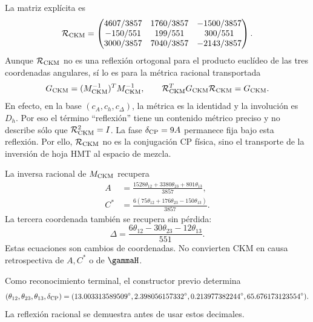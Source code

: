 La matriz expl\'icita es
\begin{equation}
\label{eq:modular-Rckm-matrix}
\mathcal R_{\rm CKM}=
\begin{pmatrix}
4607/3857&1760/3857&-1500/3857\\
-150/551&199/551&300/551\\
3000/3857&7040/3857&-2143/3857
\end{pmatrix}.
\end{equation}
Aunque \(\mathcal R_{\rm CKM}\) no es una reflexi\'on ortogonal para el
producto eucl\'ideo de las tres coordenadas angulares, s\'i lo es para la
m\'etrica racional transportada
\begin{equation}
\label{eq:modular-ckm-metric}
G_{\rm CKM}=(M_{\rm CKM}^{-1})^TM_{\rm CKM}^{-1},
\qquad
\mathcal R_{\rm CKM}^TG_{\rm CKM}\mathcal R_{\rm CKM}=G_{\rm CKM}.
\end{equation}
En efecto, en la base \((c_A,c_h,c_\Delta)\), la m\'etrica es la identidad
y la involuci\'on es \(D_h\). Por eso el t\'ermino ``reflexi\'on'' tiene un
contenido m\'etrico preciso y no describe s\'olo que
\(\mathcal R_{\rm CKM}^2=I\).
La fase \(\delta_{\rm CP}=9A\) permanece fija bajo esta reflexi\'on. Por
ello, \(\mathcal R_{\rm CKM}\) no es la conjugaci\'on CP f\'isica, sino el
transporte de la inversi\'on de hoja HMT al espacio de mezcla.

La inversa racional de \(M_{\rm CKM}\) recupera
\begin{align}
A&=\frac{1528\theta_{12}+3380\theta_{23}+801\theta_{13}}{3857},
\label{eq:modular-A-from-ckm}\\
C^*&=\frac{6(75\theta_{12}+176\theta_{23}-150\theta_{13})}{3857}.
\label{eq:modular-C-from-ckm}
\end{align}
La tercera coordenada tambi\'en se recupera sin p\'erdida:
\begin{equation}
\label{eq:modular-Delta-from-ckm}
\Delta
=\frac{6\theta_{12}-30\theta_{23}-12\theta_{13}}{551}.
\end{equation}
Estas ecuaciones son cambios de coordenadas. No convierten CKM en causa
retrospectiva de \(A,C^*\) o de \(\gammaH\).

Como reconocimiento terminal, el constructor previo determina
\begin{equation}
\label{eq:modular-ckm-values}
(\theta_{12},\theta_{23},\theta_{13},\delta_{\rm CP})
=(13.003313589509^\circ,
2.398056157332^\circ,
0.213977382244^\circ,
65.676173123554^\circ).
\end{equation}
La reflexi\'on racional se demuestra antes de usar estos decimales.

